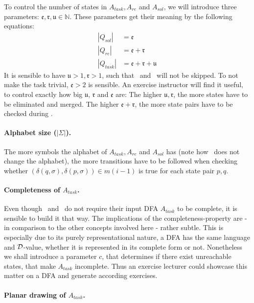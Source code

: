 To control the number of states in $A_{task}, A_{re}$ and $A_{sol}$, we will introduce three parameters: $\mathfrak{e}, \mathfrak{r}, \mathfrak{u} \in \mathbb{N}$. These parameters get their meaning by the following equations:
\begin{align*}
    |Q_{sol}| &= \mathfrak{e} \\
    |Q_{re}| &= \mathfrak{e} + \mathfrak{r} \\
    |Q_{task}| &= \mathfrak{e} + \mathfrak{r} + \mathfrak{u}
\end{align*}
It is sensible to have $\mathfrak{u} > 1, \mathfrak{r} > 1$, such that \RemUnr\ and \RemEq\ will not be skipped. To not make the task trivial, $\mathfrak{e} > 2$ is sensible. An exercise instructor will find it useful, to control exactly how big $\mathfrak{u}$, $\mathfrak{r}$ and $\mathfrak{e}$ are: The higher $\mathfrak{u}, \mathfrak{r}$, the more states have to be eliminated and merged. The higher $\mathfrak{e} + \mathfrak{r}$, the more state pairs have to be checked during \CompDist.

\paragraph*{Alphabet size ($|\Sigma|$).}

The more symbols the alphabet of $A_{task}, A_{re}$ and $A_{sol}$ has (note how \MinAlg\ does not change the alphabet), the more transitions have to be followed when checking whether $(\delta(q,\sigma),\delta(p,\sigma))\in m(i-1)$ is true for each state pair $p,q$.

\paragraph*{Completeness of $A_{task}$.}

Even though \CompUnr\ and \RemUnr\ do not require their input DFA $A_{task}$ to be complete, it is sensible to build it that way. The implications of the completeness-property are - in comparison to the other concepts involved here - rather subtle. This is especially due to its purely representational nature, a DFA has the same language and $\mathcal{D}$-value, whether it is represented in its complete form or not. Nonetheless we shall introduce a parameter $c$, that determines if there exist unreachable states, that make $A_{task}$ incomplete. Thus an exercise lecturer could showcase this matter on a DFA and generate according exercises.

\paragraph*{Planar drawing of $A_{task}$.}

